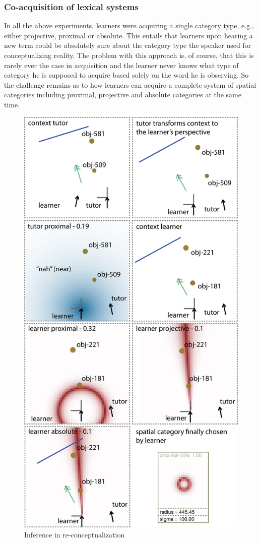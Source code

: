 \subsubsection{Co-acquisition of lexical systems}
In all the above experiments, learners were acquiring a single category type,
e.g., either projective, proximal or absolute. This entails that learners 
upon hearing a new term could be absolutely sure about the 
category type the speaker used for conceptualizing reality.
The problem with this approach is, of course, that this is rarely ever the
case in acquisition and the learner never knows what type of category he is 
supposed to acquire based solely on the word
he is observing. So the challenge remains as to how learners 
can acquire a complete system of spatial categories including proximal, 
projective and absolute categories at the same time. 

\begin{figure}
\begin{center}
\includegraphics[width=0.7\columnwidth]{figs/category-acquisition-absolute+proximal+projective-single-category-acquisition.png}
\end{center}
\caption[Inference in re-conceptualization]{Inference in re-conceptualization}
\label{f:category-acquisition-absolute+proximal+projective-single-acquisition}
\end{figure}

